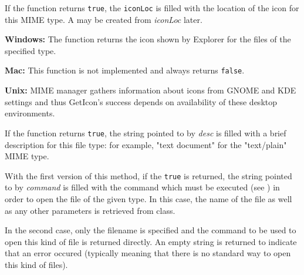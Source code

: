 \label{wxfiletypegeticon}


If the function returns {\tt true}, the {\tt iconLoc} is filled with the
location of the icon for this MIME type. A  may be
created from {\it iconLoc} later.

{\bf Windows:} The function returns the icon shown by Explorer for the files of
the specified type.

{\bf Mac:} This function is not implemented and always returns {\tt false}.

{\bf Unix:} MIME manager gathers information about icons from GNOME
and KDE settings and thus GetIcon's success depends on availability
of these desktop environments.

\label{wxfiletypegetdescription}


If the function returns {\tt true}, the string pointed to by {\it desc} is filled
with a brief description for this file type: for example, "text document" for
the "text/plain" MIME type.

\label{wxfiletypegetopencommand}



With the first version of this method, if the {\tt true} is returned, the
string pointed to by {\it command} is filled with the command which must be
executed (see ) in order to open the file of the
given type. In this case, the name of the file as well as any other parameters
is retrieved from  
class.

In the second case, only the filename is specified and the command to be used
to open this kind of file is returned directly. An empty string is returned to
indicate that an error occured (typically meaning that there is no standard way
to open this kind of files).

\label{wxfiletypegetprintcommand}


